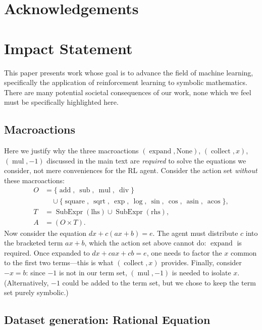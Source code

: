 \documentclass{article}
\theoremstyle{plain}
\theoremstyle{definition}
\theoremstyle{remark}
\newcommand{\op}[1]{\operatorname{#1}}
\newcommand{\SubExpr}{\operatorname{SubExpr}}
\begin{document}
\section*{Acknowledgements}


\section*{Impact Statement}

This paper presents work whose goal is to advance the field of machine learning, specifically the application of reinforcement learning to symbolic mathematics. There are many potential societal consequences of our work, none which we feel must be specifically highlighted here.

\nocite{langley00}




\newpage
\appendix
\onecolumn


\subsection{Macroactions}
Here we justify why the three macroactions $(\op{expand}, \text{None})$, $(\op{collect}, x)$, $(\op{mul}, -1)$ discussed in the main text are \textit{required} to solve the equations we consider, not mere conveniences for the RL agent. Consider the action set \textit{without} these macroactions:
\begin{align}
O &= \{\op{add},\ \op{sub},\ \op{mul},\ \op{div}\} \nonumber \\
  &\quad \cup \{\op{square},\ \op{sqrt},\ \op{exp},\ \op{log},\ \op{sin},\ \op{cos},\ \op{asin},\ \op{acos}\}, \\
T &= \SubExpr(\text{lhs}) \cup \SubExpr(\text{rhs}), \\
A &= (O \times T).
\end{align}
Now consider the equation $dx + c(ax+b) = e$. The agent must distribute $c$ into the bracketed term $ax+b$, which the action set above cannot do: $\op{expand}$ is required. Once expanded to $dx + cax + cb = e$, one needs to factor the $x$ common to the first two terms---this is what $(\op{collect}, x)$ provides. Finally, consider $-x = b$: since $-1$ is not in our term set, $(\op{mul}, -1)$ is needed to isolate $x$. (Alternatively, $-1$ could be added to the term set, but we chose to keep the term set purely symbolic.)


\subsection{Dataset generation: Rational Equation  }
\end{document}

